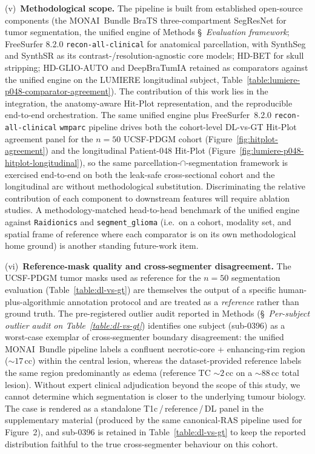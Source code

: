 \documentclass[a4paper,11pt,leqno]{article}
\begin{document}
(v)~\textbf{Methodological scope.} The pipeline is built from
established open-source components (the MONAI~Bundle BraTS
three-compartment SegResNet for tumor segmentation, the unified
engine of Methods §~\emph{Evaluation framework}; FreeSurfer 8.2.0
\texttt{recon-all-clinical} for anatomical parcellation, with
SynthSeg and SynthSR as its contrast-/resolution-agnostic core
models; HD-BET for skull stripping; HD-GLIO-AUTO and DeepBraTumIA
retained as comparators against the unified engine on the LUMIERE
longitudinal subject,
Table~\ref{table:lumiere-p048-comparator-agreement}). The contribution of this work lies in the integration, the
anatomy-aware Hit-Plot representation, and the reproducible
end-to-end orchestration. The same unified engine plus
FreeSurfer~8.2.0 \texttt{recon-all-clinical} \texttt{wmparc}
pipeline drives both the cohort-level DL-vs-GT Hit-Plot agreement
panel for the $n=50$ UCSF-PDGM cohort
(Figure~\ref{fig:hitplot-agreement}) and the longitudinal
Patient-048 Hit-Plot
(Figure~\ref{fig:lumiere-p048-hitplot-longitudinal}), so the same
parcellation-$\cap$-segmentation framework is exercised end-to-end
on both the leak-safe cross-sectional cohort and the longitudinal
arc without methodological substitution. Discriminating the
relative contribution of each component to downstream features will
require ablation studies. A
methodology-matched head-to-head benchmark of the unified engine
against \texttt{Raidionics} and \texttt{segment\_glioma} (i.e.\ on
a cohort, modality set, and spatial frame of reference where each
comparator is on its own methodological home ground) is another
standing future-work item.

(vi)~\textbf{Reference-mask quality and cross-segmenter
disagreement.} The UCSF-PDGM tumor masks used as reference for the
$n=50$ segmentation evaluation (Table~\ref{table:dl-vs-gt}) are themselves the output of a
specific human-plus-algorithmic annotation protocol and are
treated as a \emph{reference} rather than ground truth. The
pre-registered outlier audit reported in Methods (\S~\emph{Per-subject
outlier audit on Table~\ref{table:dl-vs-gt}}) identifies one subject (sub-0396) as a
worst-case exemplar of cross-segmenter boundary disagreement: the
unified MONAI~Bundle pipeline labels a confluent necrotic-core +
enhancing-rim region (${\sim}17$\,cc) within the central lesion,
whereas the dataset-provided reference labels the same region
predominantly as edema (reference TC ${\sim}2$\,cc on a ${\sim}88$\,cc
total lesion). Without expert clinical adjudication beyond the scope
of this study, we cannot determine which segmentation is closer to
the underlying tumour biology. The case is rendered as a standalone
T1c\,/\,reference\,/\,DL panel in the supplementary material
(produced by the same canonical-RAS pipeline used for Figure~2),
and sub-0396 is retained in
Table~\ref{table:dl-vs-gt} to keep the reported distribution faithful
to the true cross-segmenter behaviour on this cohort.
\end{document}
